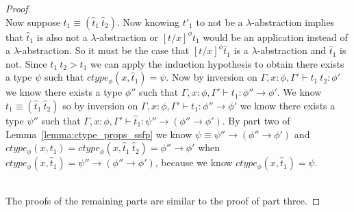 \begin{proof}
\ \\
Now suppose $t_1 \equiv (\hat{t}_1\ \hat{t}_2)$.  Now knowing $t'_1$ to not be a $\lambda$-abstraction
implies that $\hat{t}_1$ is also not a $\lambda$-abstraction or $[t/x]^\phi t_1$ would be an application
instead of a $\lambda$-abstraction.  So it must be the case that $[t/x]^\phi \hat{t}_1$ is a $\lambda$-abstraction
and $\hat{t}_1$ is not.  Since $t_1\ t_2 > t_1$ we can apply the induction hypothesis to obtain there exists
a type $\psi$ such that $ctype_\phi(x,\hat{t}_1) = \psi$.  
Now by inversion on $\Gamma,x:\phi,\Gamma' \vdash t_1\ t_2:\phi'$ we know there exists a type $\phi''$ such that
$\Gamma,x:\phi,\Gamma' \vdash t_1:\phi'' \to \phi'$.  We know $t_1 \equiv (\hat{t}_1\ \hat{t}_2)$ so by inversion on
$\Gamma,x:\phi,\Gamma' \vdash t_1:\phi'' \to \phi'$ we know there exists a type $\psi''$ such that
$\Gamma,x:\phi,\Gamma' \vdash \hat{t}_1:\psi'' \to (\phi'' \to \phi')$.
By part two of Lemma~\ref{lemma:ctype_props_ssfp} we know $\psi \equiv \psi'' \to (\phi'' \to \phi')$ and
$ctype_\phi(x,t_1) = ctype_\phi(x,\hat{t}_1\ \hat{t}_2) = \phi'' \to \phi'$ 
when $ctype_\phi(x,\hat{t}_1) = \psi'' \to (\phi'' \to \phi')$, because we know $ctype_\phi(x,\hat{t}_1) = \psi$.

\ \\
The proofs of the remaining parts are similar to the proof of part three.
\end{proof}

